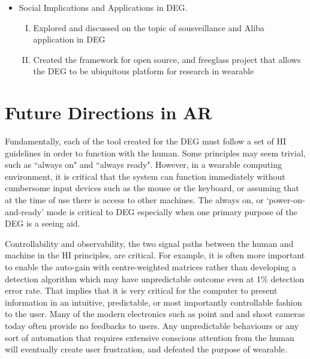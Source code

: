 \begin{itemize}
\item Social Implications and Applications in DEG. 
\begin{enumerate}[(I)]
\item Explored and discussed on the topic of sousveillance and Aliba application in DEG 
\item Created the framework for open source, and freeglass project that allows the DEG to be ubiquitous platform for research in wearable  
\end{enumerate}

\end{itemize}

\section{Future Directions in AR}



Fundamentally, each of the tool created for the DEG must follow a set of HI guidelines in order to function with the human. Some principles may seem trivial, such as ``always on" and ``always ready". However, in a wearable computing environment, it is critical that the system can function immediately without cumbersome input devices such as the mouse or the keyboard, or assuming that at the time of use there is access to other machines. The always on, or `power-on-and-ready' mode is critical to DEG especially when one primary purpose of the DEG is a seeing aid. 

Controllability and observability, the two signal paths between the human and machine in the HI principles, are critical. For example, it is often more important to enable the auto-gain with centre-weighted matrices rather than developing a detection algorithm which may have unpredictable outcome even at 1\% detection error rate. That implies that it is very critical for the computer to present information in an intuitive, predictable, or most importantly controllable fashion to the user. Many of the modern electronics such as point and and shoot cameras today often provide no feedbacks to users. Any unpredictable behaviours or any sort of automation that requires extensive conscious attention from the human will eventually create user frustration, and defeated the purpose of wearable.

